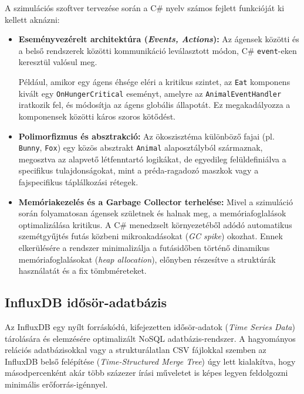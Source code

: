 A szimulációs szoftver tervezése során a C\# nyelv számos fejlett funkcióját ki kellett aknázni:
\begin{itemize}
    \item \textbf{Eseményvezérelt architektúra (\textit{Events, Actions}):} Az ágensek közötti és a belső rendszerek közötti kommunikáció leválasztott módon, C\# \texttt{event}-eken keresztül valósul meg.

Például, amikor egy ágens éhsége eléri a kritikus szintet, az \texttt{Eat} komponens kivált egy \texttt{OnHungerCritical} eseményt, amelyre az \texttt{AnimalEventHandler} iratkozik fel, és módosítja az ágens globális állapotát. Ez megakadályozza a komponensek közötti káros szoros kötődést.

    \item \textbf{Polimorfizmus és absztrakció:} Az ökoszisztéma különböző fajai (pl. \texttt{Bunny}, \texttt{Fox}) egy közös absztrakt \texttt{Animal} alaposztályból származnak, megosztva az alapvető létfenntartó logikákat, de egyedileg felüldefiniálva a specifikus tulajdonságokat, mint a préda-ragadozó maszkok vagy a fajspecifikus táplálkozási rétegek.
    \item \textbf{Memóriakezelés és a Garbage Collector terhelése:} Mivel a szimuláció során folyamatosan ágensek születnek és halnak meg, a memóriafoglalások optimalizálása kritikus. A C\# menedzselt környezetéből adódó automatikus szemétgyűjtés futás közbeni mikroakadásokat (\textit{GC spike}) okozhat. Ennek elkerülésére a rendszer minimalizálja a futásidőben történő dinamikus memóriafoglalásokat (\textit{heap allocation}), előnyben részesítve a struktúrák használatát és a fix tömbméreteket.
\end{itemize}

\subsection{InfluxDB idősör-adatbázis}
\label{subsec:influxdb}
Az InfluxDB egy nyílt forráskódú, kifejezetten idősör-adatok (\textit{Time Series Data}) tárolására és elemzésére optimalizált NoSQL adatbázis-rendszer. A hagyományos relációs adatbázisokkal vagy a strukturálatlan CSV fájlokkal szemben az InfluxDB belső felépítése (\textit{Time-Structured Merge Tree}) úgy lett kialakítva, hogy másodpercenként akár több százezer írási műveletet is képes legyen feldolgozni minimális erőforrás-igénnyel. 

